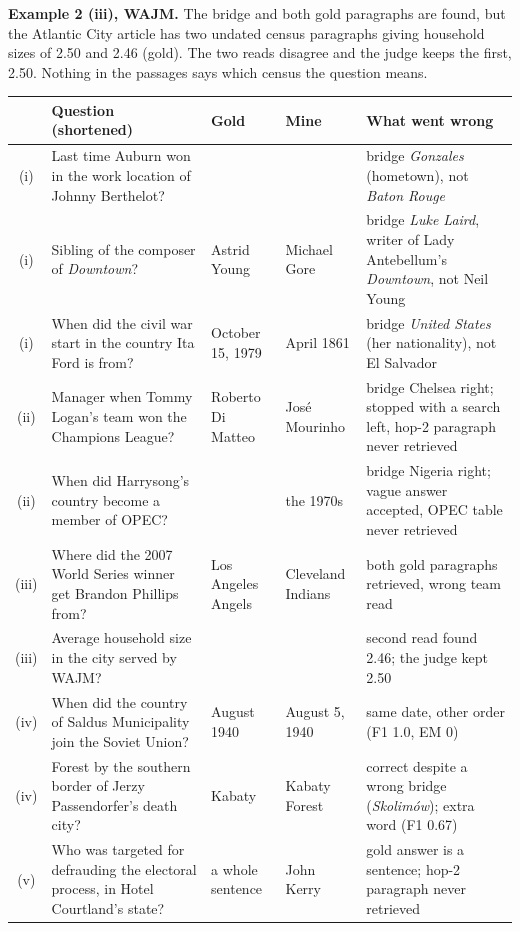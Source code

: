 \documentclass[10pt,a4paper]{article}
\begin{document}
\textbf{Example 2 (iii), WAJM.} The bridge and both gold paragraphs are found, but the Atlantic City article has
two undated census paragraphs giving household sizes of 2.50 and 2.46 (gold). The two reads disagree and the judge
keeps the first, 2.50. Nothing in the passages says which census the question means.

\vfill
\begin{center}
\footnotesize\renewcommand{\arraystretch}{1.5}
\begin{tabularx}{\textwidth}{@{}c>{\raggedright\arraybackslash}X>{\raggedright\arraybackslash}p{2.3cm}>{\raggedright\arraybackslash}p{2.6cm}>{\raggedright\arraybackslash}p{3.9cm}@{}}
\toprule
& Question (shortened) & Gold & Mine & What went wrong\\
\midrule
(i) & Last time Auburn won in the work location of Johnny Berthelot? & 1999 & 1994 & bridge \emph{Gonzales} (hometown), not \emph{Baton Rouge}\\
(i) & Sibling of the composer of \emph{Downtown}? & Astrid Young & Michael Gore & bridge \emph{Luke Laird}, writer of Lady Antebellum's \emph{Downtown}, not Neil Young\\
(i) & When did the civil war start in the country Ita Ford is from? & October 15, 1979 & April 1861 & bridge \emph{United States} (her nationality), not El Salvador\\
(ii) & Manager when Tommy Logan's team won the Champions League? & Roberto Di Matteo & Jos\'e Mourinho & bridge Chelsea right; stopped with a search left, hop-2 paragraph never retrieved\\
(ii) & When did Harrysong's country become a member of OPEC? & 1971 & the 1970s & bridge Nigeria right; vague answer accepted, OPEC table never retrieved\\
(iii) & Where did the 2007 World Series winner get Brandon Phillips from? & Los Angeles Angels & Cleveland Indians & both gold paragraphs retrieved, wrong team read\\
(iii) & Average household size in the city served by WAJM? & 2.46 & 2.50 & second read found 2.46; the judge kept 2.50\\
(iv) & When did the country of Saldus Municipality join the Soviet Union? & 5 August 1940 & August 5, 1940 & same date, other order (F1 1.0, EM 0)\\
(iv) & Forest by the southern border of Jerzy Passendorfer's death city? & Kabaty & Kabaty Forest & correct despite a wrong bridge (\emph{Skolim\'ow}); extra word (F1 0.67)\\
(v) & Who was targeted for defrauding the electoral process, in Hotel Courtland's state? & a whole sentence & John Kerry & gold answer is a sentence; hop-2 paragraph never retrieved\\
\bottomrule
\end{tabularx}
\label{tab:err}
\end{center}
\end{document}
